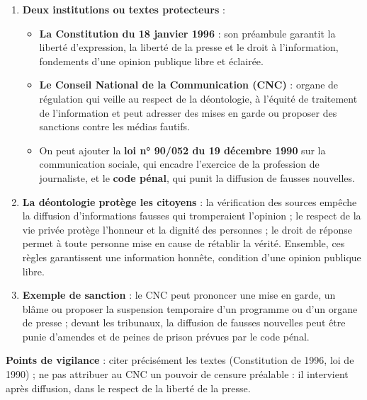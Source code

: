\documentclass[11pt]{article}
\newcommand{\cle}[1]{{\popxbold\color{popdark}#1}}
\begin{document}
\begin{corrige}
\begin{enumerate}
\item \textbf{Deux institutions ou textes protecteurs} :
\begin{itemize}
\item \textbf{La Constitution du 18 janvier 1996} : son préambule garantit la liberté d'expression, la liberté de la presse et le droit à l'information, fondements d'une opinion publique libre et éclairée.
\item \textbf{Le Conseil National de la Communication (CNC)} : organe de régulation qui veille au respect de la déontologie, à l'équité de traitement de l'information et peut adresser des mises en garde ou proposer des sanctions contre les médias fautifs.
\item On peut ajouter la \textbf{loi n° 90/052 du 19 décembre 1990} sur la communication sociale, qui encadre l'exercice de la profession de journaliste, et le \textbf{code pénal}, qui punit la diffusion de fausses nouvelles.
\end{itemize}
\item \textbf{La déontologie protège les citoyens} : la vérification des sources empêche la diffusion d'informations fausses qui tromperaient l'opinion ; le respect de la vie privée protège l'honneur et la dignité des personnes ; le \cle{droit de réponse} permet à toute personne mise en cause de rétablir la vérité. Ensemble, ces règles garantissent une information honnête, condition d'une opinion publique libre.
\item \textbf{Exemple de sanction} : le CNC peut prononcer une mise en garde, un blâme ou proposer la suspension temporaire d'un programme ou d'un organe de presse ; devant les tribunaux, la diffusion de fausses nouvelles peut être punie d'amendes et de peines de prison prévues par le code pénal.
\end{enumerate}
\textbf{Points de vigilance} : citer précisément les textes (Constitution de 1996, loi de 1990) ; ne pas attribuer au CNC un pouvoir de censure préalable : il intervient après diffusion, dans le respect de la liberté de la presse.
\end{corrige}
\end{document}
